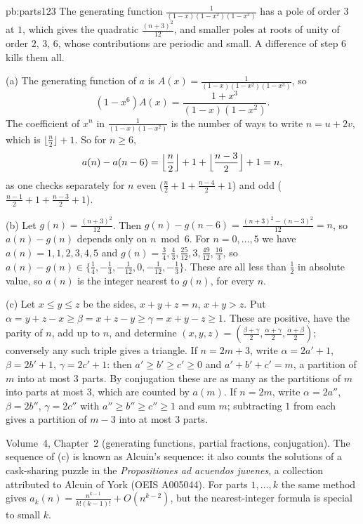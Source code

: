 \begin{solution}{pb:parts123}
\idea The generating function $\frac1{(1-x)(1-x^2)(1-x^3)}$ has a pole of order $3$ at $1$, which gives the quadratic
$\frac{(n+3)^2}{12}$, and smaller poles at roots of unity of order $2$, $3$, $6$, whose contributions are periodic and small. A
difference of step $6$ kills them all.

\writeup (a) The generating function of $a$ is $A(x)=\frac1{(1-x)(1-x^2)(1-x^3)}$, so
\[
(1-x^6)A(x)=\frac{1+x^3}{(1-x)(1-x^2)}.
\]
The coefficient of $x^n$ in $\frac1{(1-x)(1-x^2)}$ is the number of ways to write $n=u+2v$, which is $\lfloor\frac n2\rfloor+1$. So for
$n\ge6$,
\[
a(n)-a(n-6)=\Bigl\lfloor\frac n2\Bigr\rfloor+1+\Bigl\lfloor\frac{n-3}2\Bigr\rfloor+1=n,
\]
as one checks separately for $n$ even ($\frac n2+1+\frac{n-4}2+1$) and odd ($\frac{n-1}2+1+\frac{n-3}2+1$).

(b) Let $g(n)=\frac{(n+3)^2}{12}$. Then $g(n)-g(n-6)=\frac{(n+3)^2-(n-3)^2}{12}=n$, so $a(n)-g(n)$ depends only on $n\bmod6$. For
$n=0,\dots,5$ we have $a(n)=1,1,2,3,4,5$ and $g(n)=\frac34,\frac43,\frac{25}{12},3,\frac{49}{12},\frac{16}3$, so
$a(n)-g(n)\in\{\frac14,-\frac13,-\frac1{12},0,-\frac1{12},-\frac13\}$. These are all less than $\frac12$ in absolute value, so $a(n)$ is
the integer nearest to $g(n)$, for every $n$.

(c) Let $x\le y\le z$ be the sides, $x+y+z=n$, $x+y>z$. Put $\alpha=y+z-x\ge\beta=x+z-y\ge\gamma=x+y-z\ge1$. These are
positive, have the parity of $n$, add up to $n$, and determine $(x,y,z)=(\frac{\beta+\gamma}2,\frac{\alpha+\gamma}2,\frac{\alpha+\beta}2)$;
conversely any such triple gives a triangle. If $n=2m+3$, write $\alpha=2a'+1$, $\beta=2b'+1$, $\gamma=2c'+1$: then
$a'\ge b'\ge c'\ge0$ and $a'+b'+c'=m$, a partition of $m$ into at most $3$ parts. By conjugation these are as many as the
partitions of $m$ into parts at most $3$, which are counted by $a(m)$. If $n=2m$, write $\alpha=2a''$, $\beta=2b''$, $\gamma=2c''$
with $a''\ge b''\ge c''\ge1$ and sum $m$; subtracting $1$ from each gives a partition of $m-3$ into at most $3$ parts.

\tools Volume~4, Chapter~2 (generating functions, partial fractions, conjugation).
\leads The sequence of (c) is known as Alcuin's sequence: it also counts the solutions of a cask-sharing puzzle in the
\emph{Propositiones ad acuendos juvenes}, a collection attributed to Alcuin of York (OEIS A005044). For parts $1,\dots,k$ the
same method gives $a_k(n)=\frac{n^{k-1}}{k!(k-1)!}+O(n^{k-2})$, but the nearest-integer formula is special to small $k$.
\end{solution}

